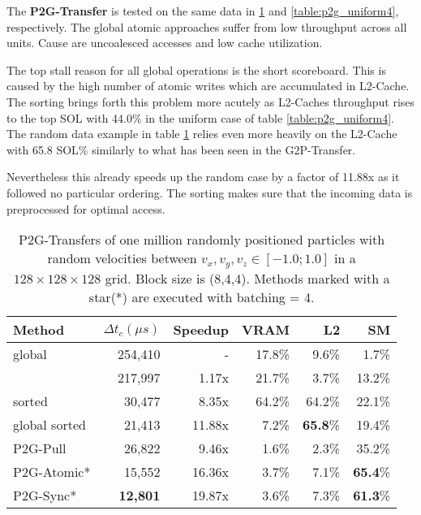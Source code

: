 \documentclass[m,times]{cgMA}
\begin{document}
The \textbf{P2G-Transfer} is tested on the same data in \ref{table:p2g_random} and \ref{table:p2g_uniform4}, respectively. The global atomic approaches suffer from low throughput across all units. Cause are uncoalesced accesses and low cache utilization.

The top stall reason for all global operations is the short scoreboard. This is caused by the high number of atomic writes which are accumulated in L2-Cache. The sorting brings forth this problem more acutely as L2-Caches throughput rises to the top SOL with 44.0\% in the uniform case of table \ref{table:p2g_uniform4}. The random data example in table \ref{table:p2g_random} relies even more heavily on the L2-Cache with 65.8 SOL\% similarly to what has been seen in the G2P-Transfer.

Nevertheless this already speeds up the random case by a factor of 11.88x as it followed no particular ordering. The sorting makes sure that the incoming data is preprocessed for optimal access.

\begin{table}[htpb]
  \begin{tabular}{ | l | r | r | r | r | r |}    \hline
    Method                 &  $\Delta t_c(\mu s)$ &Speedup         &VRAM  & L2   &SM    \\\hline
    global                 &  254,410             &-               &17.8\%&9.6\% &1.7\%  \\\hline
    \cite{Meyer2015}       &  217,997             &1.17x           &21.7\%&3.7\% &13.2\% \\\hline
    \cite{Meyer2015} sorted&   30,477		  &8.35x           &64.2\%&64.2\%&22.1\% \\\hline
    global sorted          &   21,413		  &11.88x          &7.2\% &\textbf{65.8}\%&19.4\% \\\hline
    \hline
    P2G-Pull               &   26,822             &9.46x           &1.6\% &2.3\% &35.2\%\\\hline
    P2G-Atomic*		   &   15,552             &16.36x          &3.7\% &7.1\% &\textbf{65.4}\%\\\hline
    P2G-Sync*              &   \textbf{12,801}    &19.87x          &3.6\% &7.3\% &\textbf{61.3}\%\\\hline
 \end{tabular}
 \caption{P2G-Transfers of one million randomly positioned particles with random velocities between $v_x,v_y,v_z \in [-1.0;1.0]$ in a $128\times 128\times128$ grid. Block size is (8,4,4). Methods marked with a star(*) are executed with batching = 4.}\label{table:p2g_random}
\end{table}
\end{document}
